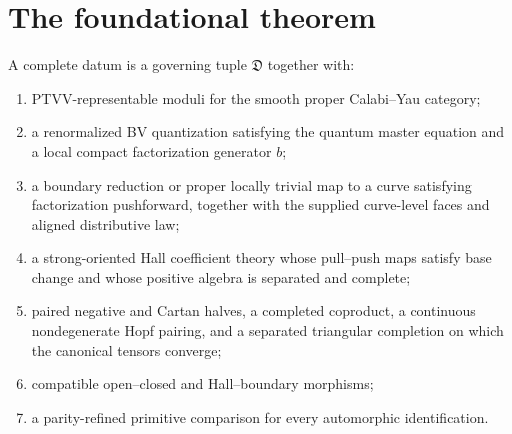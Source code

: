 \chapter{The foundational theorem}
\begin{definition}
A complete datum is a governing tuple $\mathfrak D$ together with:
\begin{enumerate}
\item PTVV-representable moduli for the smooth proper Calabi--Yau category;
\item a renormalized BV quantization satisfying the quantum master equation and a local compact factorization generator $b$;
\item a boundary reduction or proper locally trivial map to a curve satisfying factorization pushforward, together with the supplied curve-level faces and aligned distributive law;
\item a strong-oriented Hall coefficient theory whose pull--push maps satisfy base change and whose positive algebra is separated and complete;
\item paired negative and Cartan halves, a completed coproduct, a continuous nondegenerate Hopf pairing, and a separated triangular completion on which the canonical tensors converge;
\item compatible open--closed and Hall--boundary morphisms;
\item a parity-refined primitive comparison for every automorphic identification.
\end{enumerate}
\end{definition}

